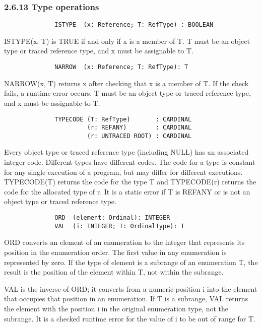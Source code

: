 \documentclass[10pt]{article}
\begin{document}
 
\subsubsection*{2.6.13 Type operations}


  
\begin{verbatim}
              ISTYPE  (x: Reference; T: RefType) : BOOLEAN
\end{verbatim}
  ISTYPE(x, T) is TRUE if and only if x is a member of T. T must be an object type or traced reference type, and x must be assignable to T.  
\begin{verbatim}
              NARROW  (x: Reference; T: RefType): T
\end{verbatim}
  NARROW(x, T) returns x after checking that x is a member of T. If the check fails, a runtime error occurs. T must be an object type or traced reference type, and x must be assignable to T. 


  
\begin{verbatim}
              TYPECODE (T: RefType)       : CARDINAL
                       (r: REFANY)        : CARDINAL
                       (r: UNTRACED ROOT) : CARDINAL
\end{verbatim}
  Every object type or traced reference type (including NULL) has an associated integer code. Different types have different codes. The code for a type is constant for any single execution of a program, but may differ for different executions. TYPECODE(T) returns the code for the type T and TYPECODE(r) returns the code for the allocated type of r. It is a static error if T is REFANY or is not an object type or traced reference type. 


  
\begin{verbatim}
              ORD  (element: Ordinal): INTEGER
              VAL  (i: INTEGER; T: OrdinalType): T
\end{verbatim}
  ORD converts an element of an enumeration to the integer that represents its position in the enumeration order. The first value in any enumeration is represented by zero. If the type of element is a subrange of an enumeration T, the result is the position of the element within T, not within the subrange. 


 VAL is the inverse of ORD; it converts from a numeric position i into the element that occupies that position in an enumeration. If T is a subrange, VAL returns the element with the position i in the original enumeration type, not the subrange. It is a checked runtime error for the value of i to be out of range for T. 
\end{document}
